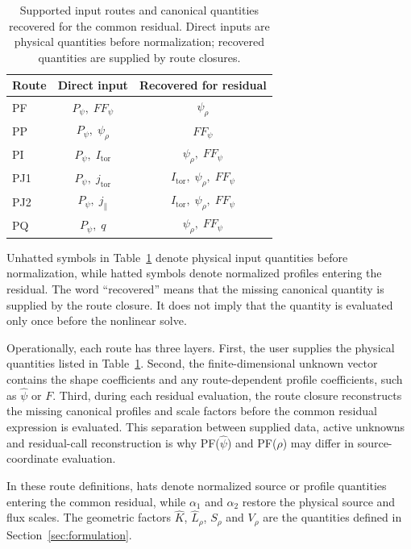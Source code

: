 \documentclass[final, 3p, times]{elsarticle}
\newcommand{\tableformat}{\centering\small}
\begin{document}
\begin{table}[tb]
    \caption{Supported input routes and canonical quantities recovered for the common residual. Direct inputs are physical quantities before normalization; recovered quantities are supplied by route closures.}
    \tableformat
    \begin{tabular}{l c c}
        \hline
        Route & Direct input                & Recovered for residual                   \\
        \hline
        PF    & $P_\psi,\;FF_\psi$          & $\psi_\rho$                              \\
        PP    & $P_\psi,\;\psi_\rho$        & $FF_\psi$                                \\
        PI    & $P_\psi,\;I_{\mathrm{tor}}$ & $\psi_\rho,\;FF_\psi$                    \\
        PJ1   & $P_\psi,\;j_{\mathrm{tor}}$ & $I_{\mathrm{tor}},\;\psi_\rho,\;FF_\psi$ \\
        PJ2   & $P_\psi,\;j_{\parallel}$    & $I_{\mathrm{tor}},\;\psi_\rho,\;FF_\psi$ \\
        PQ    & $P_\psi,\;q$                & $\psi_\rho,\;FF_\psi$                    \\
        \hline
    \end{tabular}
    \label{tab:input-routes}
\end{table}

Unhatted symbols in Table~\ref{tab:input-routes} denote physical input quantities before normalization, while hatted symbols denote normalized profiles entering the residual. The word ``recovered'' means that the missing canonical quantity is supplied by the route closure. It does not imply that the quantity is evaluated only once before the nonlinear solve.

Operationally, each route has three layers. First, the user supplies the physical quantities listed in Table~\ref{tab:input-routes}. Second, the finite-dimensional unknown vector contains the shape coefficients and any route-dependent profile coefficients, such as $\hat{\psi}$ or $F$. Third, during each residual evaluation, the route closure reconstructs the missing canonical profiles and scale factors before the common residual expression is evaluated. This separation between supplied data, active unknowns and residual-call reconstruction is why PF($\hat{\psi}$) and PF($\rho$) may differ in source-coordinate evaluation.

In these route definitions, hats denote normalized source or profile quantities entering the common residual, while $\alpha_1$ and $\alpha_2$ restore the physical source and flux scales. The geometric factors $\hat{K}$, $\hat{L}_\rho$, $S_\rho$ and $V_\rho$ are the quantities defined in Section~\ref{sec:formulation}.
\end{document}
